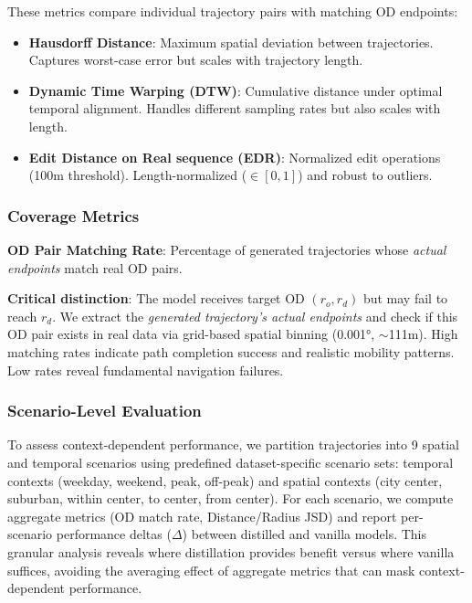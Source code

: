 These metrics compare individual trajectory pairs with matching OD endpoints:

\begin{itemize}[noitemsep,topsep=0pt]
    \item \textbf{Hausdorff Distance}: Maximum spatial deviation between trajectories. Captures worst-case error but scales with trajectory length.
    \item \textbf{Dynamic Time Warping (DTW)}: Cumulative distance under optimal temporal alignment. Handles different sampling rates but also scales with length.
    \item \textbf{Edit Distance on Real sequence (EDR)}: Normalized edit operations (100m threshold). Length-normalized ($\in [0,1]$) and robust to outliers.
\end{itemize}

\subsubsection{Coverage Metrics}

\textbf{OD Pair Matching Rate}: Percentage of generated trajectories whose \emph{actual endpoints} match real OD pairs.

\textbf{Critical distinction}: The model receives target OD $(r_o, r_d)$ but may fail to reach $r_d$. We extract the \emph{generated trajectory's actual endpoints} and check if this OD pair exists in real data via grid-based spatial binning (0.001°, $\sim$111m). High matching rates indicate path completion success and realistic mobility patterns. Low rates reveal fundamental navigation failures.

\subsubsection{Scenario-Level Evaluation}

To assess context-dependent performance, we partition trajectories into 9 spatial and temporal scenarios using predefined dataset-specific scenario sets: temporal contexts (weekday, weekend, peak, off-peak) and spatial contexts (city center, suburban, within center, to center, from center). For each scenario, we compute aggregate metrics (OD match rate, Distance/Radius JSD) and report per-scenario performance deltas ($\Delta$) between distilled and vanilla models. This granular analysis reveals where distillation provides benefit versus where vanilla suffices, avoiding the averaging effect of aggregate metrics that can mask context-dependent performance.

